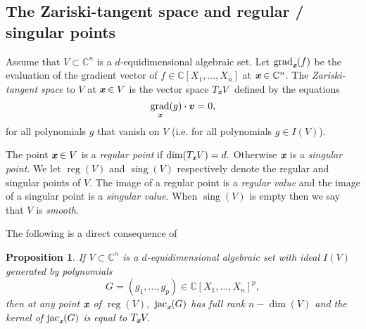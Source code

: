 \documentclass[a4paper]{article}
\def\xb{\textit{\textbf{x}}}
\DeclareMathOperator{\sing}{sing}
\DeclareMathOperator{\jac}{jac}
\DeclareMathOperator{\grad}{grad}
\DeclareMathOperator{\reg}{reg}
\def\C{\mathbb{C}}
\newtheorem{prop}[theorem]{Proposition}
\begin{document}
\subsection{The Zariski-tangent space and regular / singular points}
Assume that $V \subset \C^n$ is a $d$-equidimensional algebraic set. Let $\grad_{\xb}(f)$ be the evaluation of the gradient vector of $f \in \C[X_1,\hdots,X_n]$ at $\xb \in \C^n$. The \textit{Zariski-tangent space} to $V$ at $\xb \in V$ is the vector space $T_{\xb}V$ defined by the equations 
\[
\grad_{\xb} (g) \cdot \bm v = 0,
\] 
for all polynomials $g$ that vanish on $V$ (i.e. for all polynomials $g \in I(V)$). 
\par 
The point $\xb \in V$ is a \textit{regular point} if $\dim (T_{\xb}V) = d.$ Otherwise $\xb$ is a \textit{singular point}. We let $\reg(V)$ and $\sing(V)$ respectively denote the regular and singular points of $V$. The image of a regular point is a \textit{regular value} and the image of a singular point is a \textit{singular value}. When $\sing(V)$ is empty then we say that $V$ is \textit{smooth}.
%
\par 
The following is a direct consequence of \cite[Corollary 16.20]{ECA}
%
\begin{prop}
If $V \subset \C^n$ is a $d$-equidimensional algebraic set with ideal $I(V)$ generated by polynomials 
\[
G=(g_1,\hdots,g_p) \in \C[X_1,\hdots,X_n]^p,
\]
then at any point $\xb$ of $\reg(V),$ $\jac_{\xb}(G)$ has full rank $n - \dim(V)$ and the kernel of $\jac_{\xb}(G)$ is equal to $T_{\xb}V.$ 
\end{prop}
%
\end{document}
